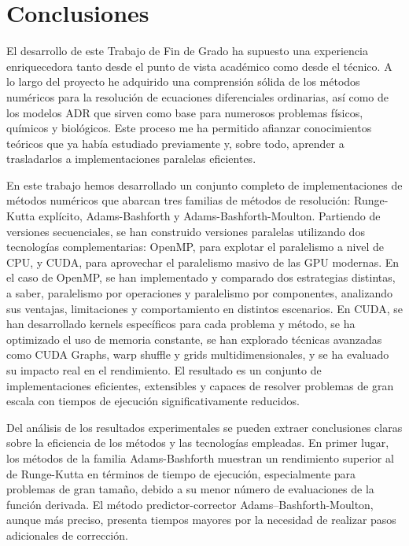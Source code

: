 \chapter{Conclusiones}

El desarrollo de este Trabajo de Fin de Grado ha supuesto una experiencia enriquecedora tanto desde el punto de vista académico como desde el técnico. A lo largo del proyecto he adquirido una comprensión sólida de los métodos numéricos para la resolución de ecuaciones diferenciales ordinarias, así como de los modelos ADR que sirven como base para numerosos problemas físicos, químicos y biológicos. Este proceso me ha permitido afianzar conocimientos teóricos que ya había estudiado previamente y, sobre todo, aprender a trasladarlos a implementaciones paralelas eficientes.

En este trabajo hemos desarrollado un conjunto completo de implementaciones de métodos numéricos que abarcan tres familias de métodos de resolución: Runge-Kutta explícito, Adams-Bashforth y Adams-Bashforth-Moulton. Partiendo de versiones secuenciales, se han construido versiones paralelas utilizando dos tecnologías complementarias: OpenMP, para explotar el paralelismo a nivel de CPU, y CUDA, para aprovechar el paralelismo masivo de las GPU modernas. En el caso de OpenMP, se han implementado y comparado dos estrategias distintas, a saber, paralelismo por operaciones y paralelismo por componentes, analizando sus ventajas, limitaciones y comportamiento en distintos escenarios. En CUDA, se han desarrollado kernels específicos para cada problema y método, se ha optimizado el uso de memoria constante, se han explorado técnicas avanzadas como CUDA Graphs, warp shuffle y grids multidimensionales, y se ha evaluado su impacto real en el rendimiento. El resultado es un conjunto de implementaciones eficientes, extensibles y capaces de resolver problemas de gran escala con tiempos de ejecución significativamente reducidos.

Del análisis de los resultados experimentales se pueden extraer conclusiones claras sobre la eficiencia de los métodos y las tecnologías empleadas. En primer lugar, los métodos de la familia Adams-Bashforth muestran un rendimiento superior al de Runge-Kutta en términos de tiempo de ejecución, especialmente para problemas de gran tamaño, debido a su menor número de evaluaciones de la función derivada. El método predictor-corrector Adams–Bashforth-Moulton, aunque más preciso, presenta tiempos mayores por la necesidad de realizar pasos adicionales de corrección. 

